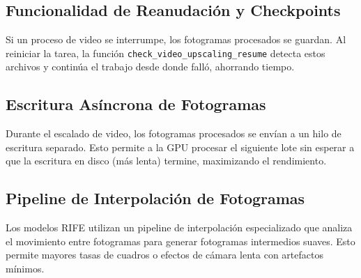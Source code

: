 \documentclass[11pt, a4paper]{article}
\newcommand{\inlinecode}[1]{\colorbox{WarlockLightGray}{\small\texttt{#1}}}
\begin{document}
\subsection{Funcionalidad de Reanudación y Checkpoints}
Si un proceso de video se interrumpe, los fotogramas procesados se guardan. Al reiniciar la tarea, la función \inlinecode{check\_video\_upscaling\_resume} detecta estos archivos y continúa el trabajo desde donde falló, ahorrando tiempo.

\subsection{Escritura Asíncrona de Fotogramas}
Durante el escalado de video, los fotogramas procesados se envían a un hilo de escritura separado. Esto permite a la GPU procesar el siguiente lote sin esperar a que la escritura en disco (más lenta) termine, maximizando el rendimiento.

\subsection{Pipeline de Interpolación de Fotogramas}
Los modelos RIFE utilizan un pipeline de interpolación especializado que analiza el movimiento entre fotogramas para generar fotogramas intermedios suaves. Esto permite mayores tasas de cuadros o efectos de cámara lenta con artefactos mínimos.


\end{document}
